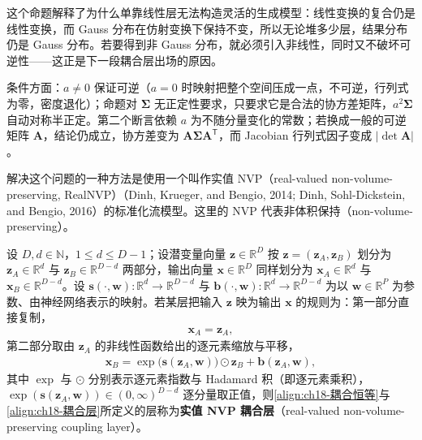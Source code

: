\documentclass[../../main.tex]{subfiles}
\begin{document}
\begin{remark}
这个命题解释了为什么单靠线性层无法构造灵活的生成模型：线性变换的复合仍是线性变换，而 Gauss 分布在仿射变换下保持不变，所以无论堆多少层，结果分布仍是 Gauss 分布。若要得到非 Gauss 分布，就必须引入非线性，同时又不破坏可逆性——这正是下一段耦合层出场的原因。

条件方面：$a\neq0$ 保证可逆（$a=0$ 时映射把整个空间压成一点，不可逆，行列式为零，密度退化）；命题对 $\bm{\Sigma}$ 无正定性要求，只要求它是合法的协方差矩阵，$a^{2}\bm{\Sigma}$ 自动对称半正定。第二个断言依赖 $a$ 为不随分量变化的常数；若换成一般的可逆矩阵 $\bm{A}$，结论仍成立，协方差变为 $\bm{A}\bm{\Sigma}\bm{A}^{\mathsf T}$，而 Jacobian 行列式因子变成 $|\det\bm{A}|$。
\end{remark}

解决这个问题的一种方法是使用一个叫作实值 NVP（real-valued non-volume-preserving, RealNVP）（Dinh, Krueger, and Bengio, 2014; Dinh, Sohl-Dickstein, and Bengio, 2016）的标准化流模型。这里的 NVP 代表非体积保持（non-volume-preserving）。

\begin{definition}\label{definition:ch18-耦合层}
设 $D,d\in\mathbb{N}$，$1\leqslant d\leqslant D-1$；设潜变量向量 $\bm{z}\in\mathbb{R}^{D}$ 按 $\bm{z}=(\bm{z}_A,\bm{z}_B)$ 划分为 $\bm{z}_A\in\mathbb{R}^{d}$ 与 $\bm{z}_B\in\mathbb{R}^{D-d}$ 两部分，输出向量 $\bm{x}\in\mathbb{R}^{D}$ 同样划分为 $\bm{x}_A\in\mathbb{R}^{d}$ 与 $\bm{x}_B\in\mathbb{R}^{D-d}$。设 $\bm{s}(\cdot,\bm{w}):\mathbb{R}^{d}\to\mathbb{R}^{D-d}$ 与 $\bm{b}(\cdot,\bm{w}):\mathbb{R}^{d}\to\mathbb{R}^{D-d}$ 为以 $\bm{w}\in\mathbb{R}^{P}$ 为参数、由神经网络表示的映射。若某层把输入 $\bm{z}$ 映为输出 $\bm{x}$ 的规则为：第一部分直接复制，
\begin{align}
  \bm{x}_A=\bm{z}_A,\label{align:ch18-耦合恒等}
\end{align}
第二部分取由 $\bm{z}_A$ 的非线性函数给出的逐元素缩放与平移，
\begin{align}
  \bm{x}_B=\exp\big(\bm{s}(\bm{z}_A,\bm{w})\big)\odot\bm{z}_B+\bm{b}(\bm{z}_A,\bm{w}),\label{align:ch18-耦合层}
\end{align}
其中 $\exp$ 与 $\odot$ 分别表示逐元素指数与 Hadamard 积（即逐元素乘积），$\exp(\bm{s}(\bm{z}_A,\bm{w}))\in(0,\infty)^{D-d}$ 逐分量取正值，则\eqref{align:ch18-耦合恒等}与\eqref{align:ch18-耦合层}所定义的层称为\textbf{实值 NVP 耦合层}（real-valued non-volume-preserving coupling layer）。
\end{definition}
\end{document}
